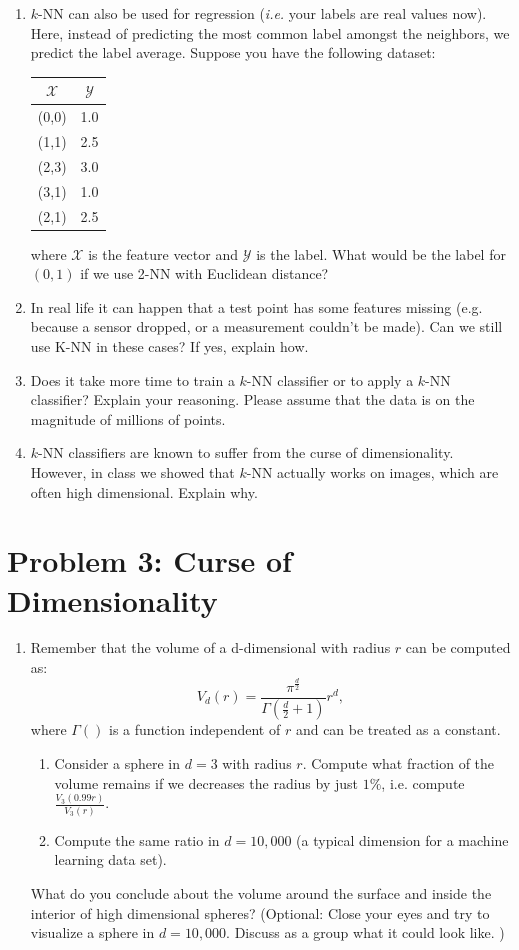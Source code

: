 \documentclass[11pt]{article}
\begin{document}
\begin{enumerate}
    \item $k$-NN can also be used for regression (\emph{i.e.} your labels are real values now). Here, instead of predicting the most common label amongst the neighbors, we predict the label average. Suppose you have the following dataset: 
    \begin{center}
      \begin{tabular}{|c|c|}
        \hline
        $\mathcal{X}$ & $\mathcal{Y}$ \\
        \hline
        (0,0) & 1.0 \\
        (1,1) & 2.5 \\
        (2,3) & 3.0 \\
        (3,1) & 1.0 \\
        (2,1) & 2.5 \\
        \hline
      \end{tabular}
    \end{center}
    where $\mathcal{X}$ is the feature vector and $\mathcal{Y}$ is the label. What would be the label for $(0,1)$ if we use 2-NN with Euclidean distance?
    \item In real life it can happen that a test point has some features missing (e.g. because a sensor dropped, or a measurement couldn't be made). Can we still use K-NN in these cases? If yes, explain how.   
    \item Does it take more time to train a $k$-NN classifier or to apply a $k$-NN classifier? Explain your reasoning. Please assume that the data is on the magnitude of millions of points.
    \item $k$-NN classifiers are known to suffer from the curse of dimensionality. However, in class we showed that $k$-NN actually works on images, which are often high dimensional. Explain why.
  \end{enumerate}

   \section*{Problem 3: Curse of Dimensionality}
   \begin{enumerate}
	\item Remember that the volume of a d-dimensional with radius $r$ can be computed as:
	\begin{equation}
		V_d(r)=\frac{\pi^{\frac{d}{2}}}{\Gamma(\frac{d}{2}+1)} r^{d},
	\end{equation}
	where $\Gamma()$ is a function independent of $r$ and can be treated as a constant. 	 
	\begin{enumerate}
		\item Consider a sphere in $d=3$ with radius $r$. Compute what fraction of the volume remains if we decreases the radius by just $1\%$, i.e. compute $\frac{V_3(0.99r)}{V_3(r)}$. 
	\item Compute the same ratio in $d=10,000$ (a typical dimension for a machine learning data set). 
	\end{enumerate}
	What do you conclude about the volume around the surface and inside the interior of high dimensional spheres? (Optional: Close your eyes and try to visualize a sphere in $d=10,000$. Discuss as a group what it could look like. )
   \end{enumerate}
\end{document}
